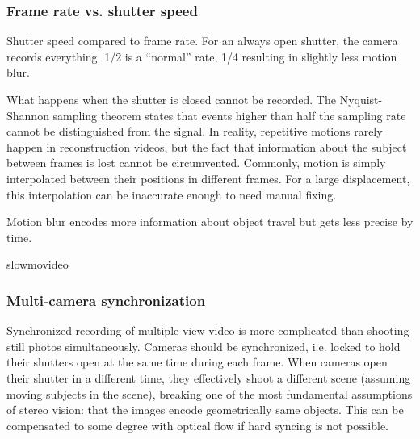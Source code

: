 
\subsubsection{Frame rate vs. shutter speed} %

{Shutter speed compared to frame rate. For an always open shutter, the camera records everything. 1/2 is a ``normal'' rate, 1/4 resulting in slightly less motion blur.}

What happens when the shutter is closed cannot be recorded.
The Nyquist-Shannon sampling theorem states that events higher than half the sampling rate cannot be distinguished from the signal.
In reality, repetitive motions rarely happen in reconstruction videos, but the fact that information about the subject between frames is lost cannot be circumvented.
Commonly, motion is simply interpolated between their positions in different frames.
For a large displacement, this interpolation can be inaccurate enough to need manual fixing.

Motion blur encodes more information about object travel but gets less precise by time.

slowmovideo 
\cite{slowmovideo}


\subsubsection{Multi-camera synchronization} %


Synchronized recording of multiple view video is more complicated than shooting still photos simultaneously.
Cameras should be synchronized, i.e. locked to hold their shutters open at the same time during each frame.
When cameras open their shutter in a different time, they effectively shoot a different scene (assuming moving subjects in the scene), breaking one of the most fundamental assumptions of stereo vision: that the images encode geometrically same objects.
This can be compensated to some degree with optical flow if hard syncing is not possible. \cite{bradley2009synchronization}

